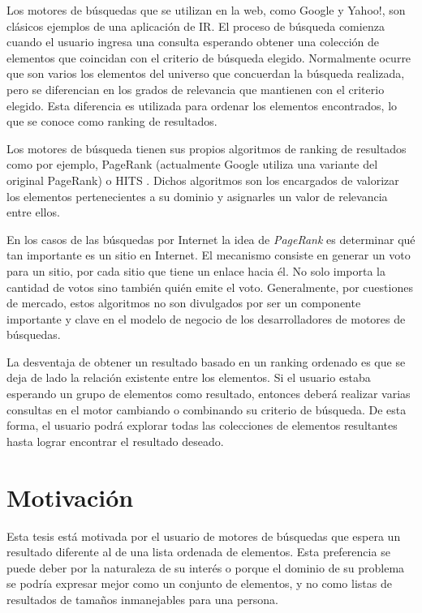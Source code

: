 Los motores de búsquedas que se utilizan en la web, como Google y Yahoo!, son clásicos ejemplos de una aplicación de IR. El proceso de búsqueda comienza cuando el usuario ingresa una consulta esperando obtener una colección de elementos que coincidan con el criterio de búsqueda elegido. Normalmente ocurre que son varios los elementos del universo que concuerdan la búsqueda realizada, pero se diferencian en los grados de relevancia que mantienen con el criterio elegido. Esta diferencia es utilizada para ordenar los elementos encontrados, lo que se conoce como ranking de resultados.

Los motores de búsqueda tienen sus propios algoritmos de ranking de resultados como por ejemplo, PageRank (actualmente Google utiliza una variante del original PageRank) \cite{Brin:1998:ALH:297810.297827} o HITS \cite{Kleinberg:1999:ASH:324133.324140}. Dichos algoritmos son los encargados de valorizar los elementos pertenecientes a su dominio y asignarles un valor de relevancia entre ellos. 

En los casos de las búsquedas por Internet la idea de \textit{PageRank} \cite{Brin:1998:ALH:297810.297827} es determinar qué tan importante es un sitio en Internet. El mecanismo consiste en generar un voto para un sitio, por cada sitio que tiene un enlace hacia él. No solo importa la cantidad de votos sino también quién emite el voto. Generalmente, por cuestiones de mercado, estos algoritmos no son divulgados por ser un componente importante y clave en el modelo de negocio de los desarrolladores de motores de búsquedas. 

La desventaja de obtener un resultado basado en un ranking ordenado es que se deja de lado la relación existente entre los elementos. Si el usuario estaba esperando un grupo de elementos como resultado, entonces deberá realizar varias consultas en el motor cambiando o combinando su criterio de búsqueda. De esta forma, el usuario podrá explorar todas las colecciones de elementos resultantes hasta lograr encontrar el resultado deseado.

\section{Motivación}
Esta tesis está motivada por el usuario de motores de búsquedas que espera un resultado diferente al de una lista ordenada de elementos. Esta preferencia se puede deber por la naturaleza de su interés o porque el dominio de su problema se podría expresar mejor como un conjunto de elementos, y no como listas de resultados de tamaños inmanejables para una persona.

